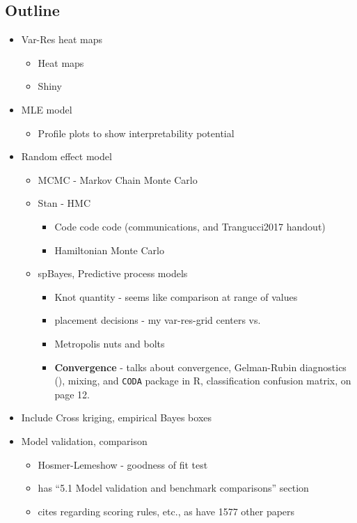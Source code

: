 \documentclass{article}
\begin{document}
\subsection*{Outline} %
\begin{itemize}
\item Var-Res heat maps
  \begin{itemize}
  \item Heat maps
  \item Shiny
  \end{itemize}
\item MLE model
  \begin{itemize}
  \item Profile plots to show interpretability potential
  \end{itemize}
\item Random effect model
  \begin{itemize}
  \item MCMC - Markov Chain Monte Carlo
  \item Stan - HMC
          \begin{itemize}
          \item Code code code (communications, and Trangucci2017 handout)
          \item Hamiltonian Monte Carlo \citep{Neal2011}
          \end{itemize}
  \item spBayes, Predictive process models
          \begin{itemize}
          \item Knot quantity - seems like comparison at range of values
          \item placement decisions - my var-res-grid centers vs. \citep{Nychka1998}
          \item Metropolis nuts and bolts
          \item {\bf Convergence} - \cite{Finley2011} talks about convergence, Gelman-Rubin diagnostics (\citep{Gelman2014}), mixing, and \verb|CODA| package in R, classification confusion matrix, on page 12.
          \end{itemize}
  \end{itemize}
\item Include Cross kriging, empirical Bayes boxes
\item Model validation, comparison
      \begin{itemize}
      \item Hosmer-Lemeshow - goodness of fit test
      \item \cite{Finley2011} has ``5.1 Model validation and benchmark comparisons'' section
      \item \cite{Finley2011} cites \cite{Gneiting2007} regarding scoring rules, etc., as have 1577 other papers
      \end{itemize}
\end{itemize}
\end{document}
